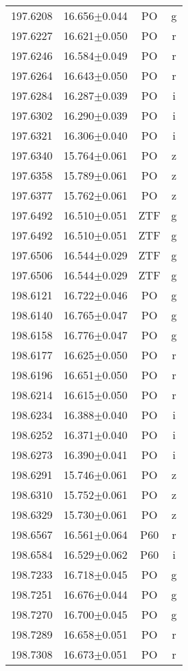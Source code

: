 \begin{table}
\begin{tabular}{cccc}
197.6208 & 16.656$\pm$0.044 & PO & g \\
197.6227 & 16.621$\pm$0.050 & PO & r \\
197.6246 & 16.584$\pm$0.049 & PO & r \\
197.6264 & 16.643$\pm$0.050 & PO & r \\
197.6284 & 16.287$\pm$0.039 & PO & i \\
197.6302 & 16.290$\pm$0.039 & PO & i \\
197.6321 & 16.306$\pm$0.040 & PO & i \\
197.6340 & 15.764$\pm$0.061 & PO & z \\
197.6358 & 15.789$\pm$0.061 & PO & z \\
197.6377 & 15.762$\pm$0.061 & PO & z \\
197.6492 & 16.510$\pm$0.051 & ZTF & g \\
197.6492 & 16.510$\pm$0.051 & ZTF & g \\
197.6506 & 16.544$\pm$0.029 & ZTF & g \\
197.6506 & 16.544$\pm$0.029 & ZTF & g \\
198.6121 & 16.722$\pm$0.046 & PO & g \\
198.6140 & 16.765$\pm$0.047 & PO & g \\
198.6158 & 16.776$\pm$0.047 & PO & g \\
198.6177 & 16.625$\pm$0.050 & PO & r \\
198.6196 & 16.651$\pm$0.050 & PO & r \\
198.6214 & 16.615$\pm$0.050 & PO & r \\
198.6234 & 16.388$\pm$0.040 & PO & i \\
198.6252 & 16.371$\pm$0.040 & PO & i \\
198.6273 & 16.390$\pm$0.041 & PO & i \\
198.6291 & 15.746$\pm$0.061 & PO & z \\
198.6310 & 15.752$\pm$0.061 & PO & z \\
198.6329 & 15.730$\pm$0.061 & PO & z \\
198.6567 & 16.561$\pm$0.064 & P60 & r \\
198.6584 & 16.529$\pm$0.062 & P60 & i \\
198.7233 & 16.718$\pm$0.045 & PO & g \\
198.7251 & 16.676$\pm$0.044 & PO & g \\
198.7270 & 16.700$\pm$0.045 & PO & g \\
198.7289 & 16.658$\pm$0.051 & PO & r \\
198.7308 & 16.673$\pm$0.051 & PO & r \\

\end{tabular}
\end{table}
